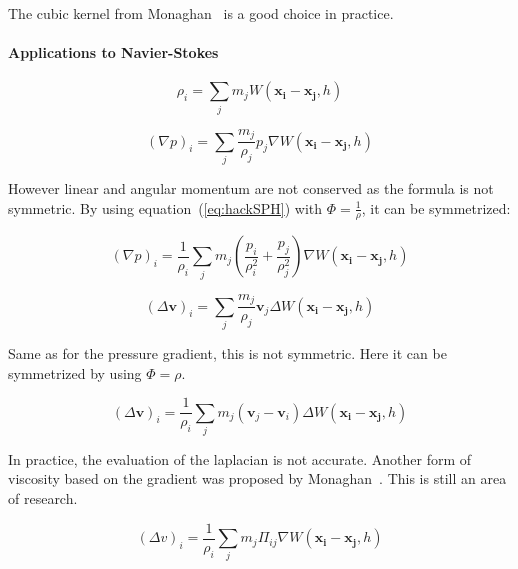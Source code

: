 The cubic kernel from Monaghan~\cite{Monaghan2005} is a good choice in practice.

\paragraph{Applications to Navier-Stokes}

\begin{equation}
\rho_{i} = \sum_{j} m_{j}W(\mathbf{x_{i}}-\mathbf{x_{j}},h)
\end{equation}

\begin{equation}
\left(\nabla p\right)_{i} = \sum_{j} \frac{m_{j}}{\rho_{j}} p_{j} \nabla W(\mathbf{x_{i}}-\mathbf{x_{j}},h)
\end{equation}

However linear and angular momentum are not conserved as the formula is not symmetric. By using equation~(\ref{eq:hackSPH}) with $\displaystyle \Phi = \frac{1}{\rho}$, it can be symmetrized:

\begin{equation}
\left(\nabla p\right)_{i} = 
\frac{1}{\rho_{i}}
\sum_{j} m_{j} \left( \frac{p_{i}}{\rho_{i}^{2}} + \frac{p_{j}}{\rho_{j}^{2}} \right) \nabla W(\mathbf{x_{i}}-\mathbf{x_{j}},h)
\end{equation}

\begin{equation}
\left(\Delta \mathbf{v}\right)_{i} = \sum_{j} \frac{m_{j}}{\rho_{j}} \mathbf{v}_{j} \Delta W(\mathbf{x_{i}}-\mathbf{x_{j}},h)
\end{equation}

Same as for the pressure gradient, this is not symmetric. Here it can be symmetrized by using $\Phi = \rho$.

\begin{equation}
\left(\Delta \mathbf{v}\right)_{i} = \frac{1}{\rho_{i}}\sum_{j} m_{j} \left( \mathbf{v}_{j}-\mathbf{v}_{i}\right) \Delta W(\mathbf{x_{i}}-\mathbf{x_{j}},h)
\end{equation}

In practice, the evaluation of the laplacian is not accurate. Another form of viscosity based on the gradient was proposed by Monaghan~\cite{Monaghan2005}. This is still an area of research.

\begin{equation}
\left(\Delta v\right)_{i} = 
\frac{1}{\rho_{i}}
\sum_{j} m_{j} \Pi_{ij} \nabla W(\mathbf{x_{i}}-\mathbf{x_{j}},h)
\end{equation}

